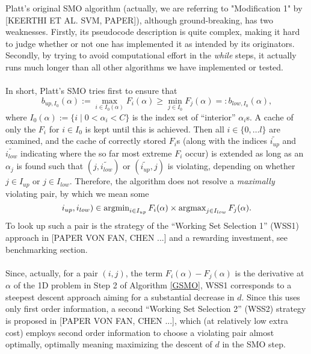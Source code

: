 Platt's original SMO algorithm (actually, we are referring to "Modification 1" by \cite{keerthisvm}[KEERTHI ET AL. SVM, PAPER]), although ground-breaking, has two weaknesses. Firstly, its pseudocode description is quite complex, making it hard to judge whether or not one has implemented it as intended by its originators. Secondly, by trying to avoid computational effort in the \textit{while} steps, it actually runs much longer than all other algorithms we have implemented or tested.\\\\
In short, Platt's SMO tries first to ensure that
\[
b_{up,I_0}(\alpha) := \max_{i \in I_0(\alpha)} F_i(\alpha) \geq \min_{j \in I_0} F_j(\alpha) =: b_{low,I_0}(\alpha),
\]
where $I_0(\alpha) := \{ i  \mid  0 < \alpha_i < C \}$ is the index set of ``interior'' $\alpha_i$s. A cache of only the $F_i$ for $i \in I_0$ is kept until this is achieved. Then all $i \in \{0,\ldots l\}$ are examined, and the cache of correctly stored $F_i$s (along with the indices $\widetilde{i_{up}}$ and $\widetilde{i_{low}}$ indicating where the so far most extreme $F_i$ occur) is extended as long as an $\alpha_j$ is found such that $(j,\widetilde{i_{low}})$ or $(\widetilde{i_{up}},j)$ is violating, depending on whether $j \in I_{up}$ or $j \in I_{low}$. Therefore, the algorithm does not resolve a \textit{maximally} violating pair, by which we mean some 
\[
i_{up},i_{low}) \in \operatorname{argmin}_{i \in I_{up}}F_i(\alpha) \times \operatorname{argmax}_{j \in I_{low}}F_j(\alpha).
\] To look up such a pair is the strategy of the ``Working Set Selection 1'' (WSS1) approach in [PAPER VON FAN, CHEN ...] and a rewarding investment, see benchmarking section. \\\\
Since, actually, for a pair $(i,j)$, the term $F_i(\alpha) - F_j(\alpha)$ is the derivative at $\alpha$ of the 1D problem in Step 2 of Algorithm \ref{GSMO}, WSS1 corresponds to a steepest descent approach aiming for a substantial decrease in $d$. Since this uses only first order information, a second ``Working Set Selection 2'' (WSS2) strategy is proposed in [PAPER VON FAN, CHEN ...], which (at relatively low extra cost) employs second order information to choose a violating pair almost optimally, optimally meaning maximizing the descent of $d$ in the SMO step.
